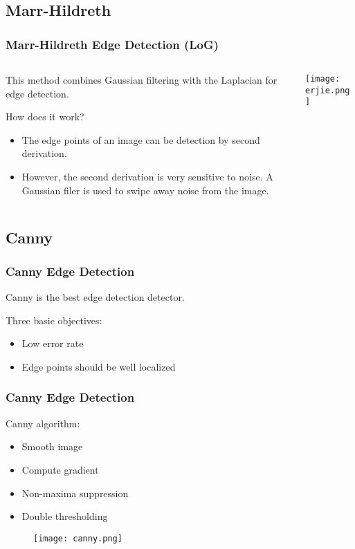 \documentclass[notheorems,serif,table,compress]{beamer}  %
\begin{document}
\subsection{Marr-Hildreth}
\begin{frame}
\frametitle{Marr-Hildreth Edge Detection (LoG)}
\begin{columns}
\begin{column}{0.55\linewidth}
This method combines Gaussian filtering with the Laplacian for edge detection.\newline

{\color{blue}How does it work?}
    \begin{itemize}
    \item The edge points of an image can be detection by {\color{blue}second derivation}.
    \item However, the second derivation is very sensitive to noise. A {\color{blue}Gaussian filer} is used to swipe away noise from the image.
    \end{itemize}
\end{column}
\begin{column}{0.45\linewidth}
\centering\texttt{[image: erjie.png]}
\end{column}
\end{columns}\vspace{1ex}
\end{frame}

\subsection{Canny}
\begin{frame}
\frametitle{Canny Edge Detection}
Canny is the best edge detection detector.\newline

Three basic objectives:
\begin{itemize}
\item Low error rate
\item Edge points should be well localized
\end{itemize}
\end{frame}

\begin{frame}
\frametitle{Canny Edge Detection}
Canny algorithm:
\begin{itemize}
\item Smooth image
\item Compute gradient
\item Non-maxima suppression
\item Double thresholding
\end{itemize}
    \begin{figure}
    \texttt{[image: canny.png]} 
    \end{figure}
\end{frame}
\end{document}
